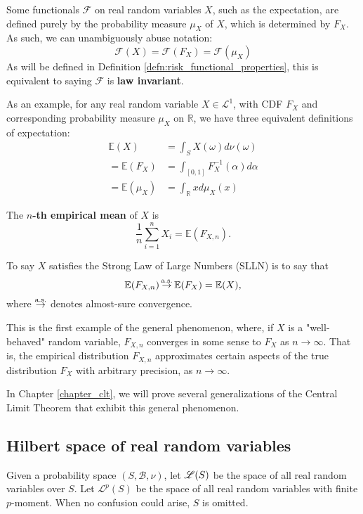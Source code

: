 \begin{conv}
Some functionals $\mathcal{F}$ on real random variables $X$, such as the expectation, are defined purely by the probability measure $\mu_X$ of $X$, which is determined by $F_X$. As such, we can unambiguously abuse notation:
\begin{equation}
\mathcal{F}(X) = \mathcal{F}(F_X) = \mathcal{F}(\mu_X) 
\end{equation}
As will be defined in Definition \ref{defn:risk_functional_properties}, this is equivalent to saying $\mathcal{F}$ is \textbf{law invariant}.

As an example, for any real random variable $X\in\mathscr{L}^1$, with CDF $F_X$ and corresponding probability measure $\mu_X$ on $\mathbb{R}$, we have three equivalent definitions of expectation:
\begin{equation}
	\label{eq:expectation_integral}
	\begin{aligned}
	  \mathbb{E}(X) &= \int_S X(\omega) d\nu(\omega) \\
	= \mathbb{E}(F_X) &= \int_{[0, 1]} F_X^{-1}(\alpha)d\alpha \\
	= \mathbb{E}(\mu_X) &= \int_\mathbb{R} x d\mu_X(x) 
	\end{aligned}
\end{equation}
\end{conv}

\begin{ex}
\label{ex:IID_average}
The \textbf{$n$-th empirical mean} of $X$ is 
$$\frac 1 n \sum_{i = 1}^n X_i = \mathbb{E}(F_{X, n}).$$

To say $X$ satisfies the Strong Law of Large Numbers (SLLN) is to say that 
$$\mathbb{E}(F_{X, n})\operatorname*{\stackrel{\text {a.s.}}{\rightarrow}} \mathbb{E}(F_X)=\mathbb{E}(X),$$
where $\operatorname*{\stackrel{\text {a.s.}}{\rightarrow}}$ denotes almost-sure convergence.
\end{ex}

This is the first example of the general phenomenon, where, if $X$ is a "well-behaved" random variable, $F_{X, n}$ converges in some sense to $F_X$ as $n\to \infty$. That is, the empirical distribution $F_{X, n}$ approximates certain aspects of the true distribution $F_X$ with arbitrary precision, as $n\to \infty$.

In Chapter \ref{chapter_clt}, we will prove several generalizations of the Central Limit Theorem that exhibit this general phenomenon.

\subsection{Hilbert space of real random variables}
\begin{notn}
Given a probability space \((S, \mathcal{B}, \nu)\), let $\mathscr{L}(S)$ be the space of all real random variables over $S$. Let \(\mathscr{L}^p(S)\) be the space of all real random variables with finite $p$-moment. When no confusion could arise, $S$ is omitted.
\end{notn}

